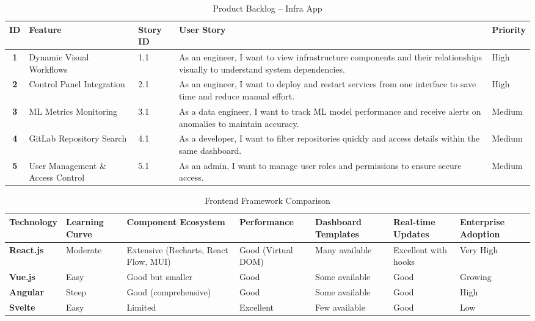 \documentclass[a4paper,12pt]{article} %
\begin{document}
\begin{table}[h!]
\centering
\caption{Product Backlog – Infra App}
\renewcommand{\arraystretch}{1.4} %
\setlength{\arrayrulewidth}{0.5mm} %
\setlength{\tabcolsep}{5pt} %
\begin{tabular}{|>{\bfseries}c|m{3.5cm}|m{2cm}|m{8cm}|>{\centering\arraybackslash}m{1.5cm}|}
\hline
\textbf{ID} & \textbf{Feature} & \textbf{Story ID} & \textbf{User Story} & \textbf{Priority} \\ 
\hline
1 & Dynamic Visual Workflows & 1.1 & As an engineer, I want to view infrastructure components and their relationships visually to understand system dependencies. & High \\[1ex]
\hline
2 & Control Panel Integration & 2.1 & As an engineer, I want to deploy and restart services from one interface to save time and reduce manual effort. & High \\[1ex]
\hline
3 & ML Metrics Monitoring & 3.1 & As a data engineer, I want to track ML model performance and receive alerts on anomalies to maintain accuracy. & Medium \\[1ex]
\hline
4 & GitLab Repository Search & 4.1 & As a developer, I want to filter repositories quickly and access details within the same dashboard. & Medium \\[1ex]
\hline
5 & User Management \& Access Control & 5.1 & As an admin, I want to manage user roles and permissions to ensure secure access. & Medium \\ 
\hline
\end{tabular}
\end{table}

\hspace{-3cm}
\begin{table}[h!]
\centering
\renewcommand{\arraystretch}{1.8} %
\setlength{\arrayrulewidth}{0.3mm} %
\setlength{\tabcolsep}{4pt} %
\begin{tabular}{|>{\bfseries}m{2.3cm}|m{2cm}|m{3cm}|m{2.5cm}|m{2.5cm}|m{2cm}|m{2cm}|}
\hline
\textbf{Technology} & \textbf{Learning Curve} & \textbf{Component Ecosystem} & \textbf{Performance} & \textbf{Dashboard Templates} & \textbf{Real-time Updates} & \textbf{Enterprise Adoption} \\ 
\hline
React.js & Moderate & Extensive (Recharts, React Flow, MUI) & Good (Virtual DOM) & Many available & Excellent with hooks & Very High \\[1ex]
\hline
Vue.js & Easy & Good but smaller & Good & Some available & Good & Growing \\[1ex]
\hline
Angular & Steep & Good (comprehensive) & Good & Some available & Good & High \\[1ex]
\hline
Svelte & Easy & Limited & Excellent & Few available & Good & Low \\ 
\hline
\end{tabular}
\caption{Frontend Framework Comparison}
\end{table}
\end{document}
